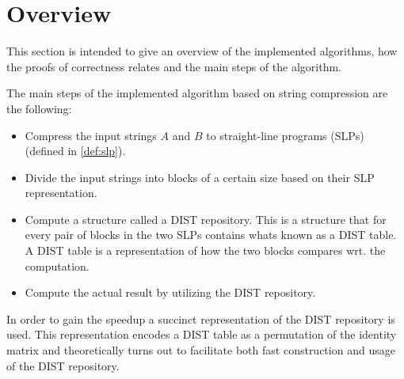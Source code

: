 \documentclass[twoside,11pt,openright]{report}
\begin{document}
\section{Overview}
This section is intended to give an overview of the implemented algorithms, how the proofs of correctness relates and the main steps of the algorithm.

The main steps of the implemented algorithm based on string compression are the following:
\begin{itemize}
  \item Compress the input strings $A$ and $B$ to straight-line programs (SLPs) (defined in \cref{def:slp}).
  \item Divide the input strings into blocks of a certain size based on their SLP representation.
  \item Compute a structure called a DIST repository. This is a structure that for every pair of blocks in the two SLPs contains whats known as a DIST table. A DIST table is a representation of how the two blocks compares wrt. the computation.
  \item Compute the actual result by utilizing the DIST repository.
\end{itemize}
In order to gain the speedup a succinct representation of the DIST repository is used. This representation encodes a DIST table as a permutation of the identity matrix and theoretically turns out to facilitate both fast construction and usage of the DIST repository.
\end{document}
